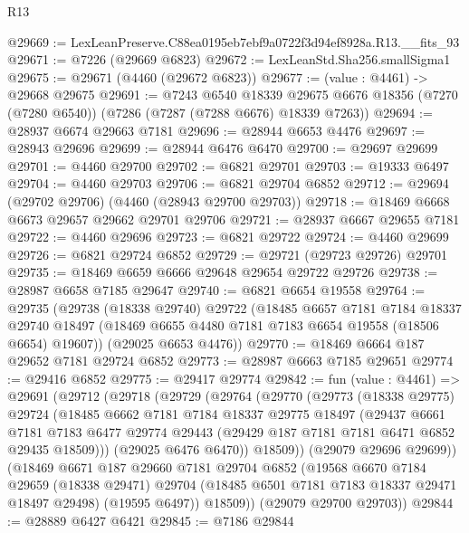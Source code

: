 \begin{lexlean}{R13}
\begin{coremodule}
@29669 := LexLeanPreserve.C88ea0195eb7ebf9a0722f3d94ef8928a.R13.__fits_93
@29671 := @7226 (@29669 @6823)
@29672 := LexLeanStd.Sha256.smallSigma1
@29675 := @29671 (@4460 (@29672 @6823))
@29677 := (value : @4461) -> @29668 @29675
@29691 := @7243
    @6540
    @18339
    @29675
    @6676
    @18356
    (@7270 (@7280 @6540))
    (@7286 (@7287 (@7288 @6676) @18339 @7263))
@29694 := @28937 @6674 @29663 @7181
@29696 := @28944 @6653 @4476
@29697 := @28943 @29696
@29699 := @28944 @6476 @6470
@29700 := @29697 @29699
@29701 := @4460 @29700
@29702 := @6821 @29701
@29703 := @19333 @6497
@29704 := @4460 @29703
@29706 := @6821 @29704 @6852
@29712 := @29694 (@29702 @29706) (@4460 (@28943 @29700 @29703))
@29718 := @18469 @6668 @6673 @29657 @29662 @29701 @29706
@29721 := @28937 @6667 @29655 @7181
@29722 := @4460 @29696
@29723 := @6821 @29722
@29724 := @4460 @29699
@29726 := @6821 @29724 @6852
@29729 := @29721 (@29723 @29726) @29701
@29735 := @18469 @6659 @6666 @29648 @29654 @29722 @29726
@29738 := @28987 @6658 @7185 @29647
@29740 := @6821 @6654 @19558
@29764 := @29735
    (@29738
      (@18338 @29740)
      @29722
      (@18485
        @6657
        @7181
        @7184
        @18337
        @29740
        @18497
        (@18469 @6655 @4480 @7181 @7183 @6654 @19558 (@18506 @6654) @19607))
      (@29025 @6653 @4476))
@29770 := @18469 @6664 @187 @29652 @7181 @29724 @6852
@29773 := @28987 @6663 @7185 @29651
@29774 := @29416 @6852
@29775 := @29417 @29774
@29842 := fun (value : @4461) =>
  @29691
    (@29712
      (@29718
        (@29729
          (@29764
            (@29770
              (@29773
                (@18338 @29775)
                @29724
                (@18485
                  @6662
                  @7181
                  @7184
                  @18337
                  @29775
                  @18497
                  (@29437
                    @6661
                    @7181
                    @7183
                    @6477
                    @29774
                    @29443
                    (@29429 @187 @7181 @7181 @6471 @6852 @29435 @18509)))
                (@29025 @6476 @6470))
              @18509))
          (@29079 @29696 @29699))
        (@18469
          @6671
          @187
          @29660
          @7181
          @29704
          @6852
          (@19568
            @6670
            @7184
            @29659
            (@18338 @29471)
            @29704
            (@18485 @6501 @7181 @7183 @18337 @29471 @18497 @29498)
            (@19595 @6497))
          @18509))
      (@29079 @29700 @29703))
@29844 := @28889 @6427 @6421
@29845 := @7186 @29844

\end{coremodule}
\end{lexlean}
